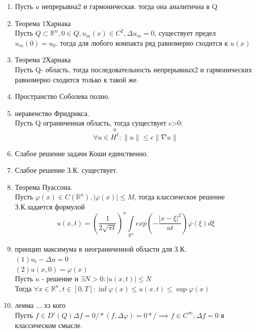 \documentclass[a4paper,12pt]{article}
\newcommand {\SL} {\implies}
\newcommand {\FI} {\varphi}
\newcommand {\iii} {\int\limits}
\begin{document}
\begin{enumerate}
\item Пусть $u$ непрерывна2 и гармоническая. тогда она аналитична в Q
\item Теорема 1Харнака\\
Пусть $Q\subset \mathbb{R}^n, 0\in Q, u_m(x)\in C^2, \Delta u_m=0$, существует предел $u_m(0) = u_0$. тогда для любого компакта ряд равномерно сходится к $u(x)$
\item Теорема 2Харнака\\
Пусть Q- область, тогда последовательность непрерывных2 и гармонических равномерно сходится только к такой же.\\
\item Пространство Соболева полно.
\item неравенство Фридрикса.\\
Пусть Q ограниченная область, тогда существует c>0:$$\forall u\in \stackrel{0}{H^1}: \|u\|\le c\|\nabla u\|$$
\item Слабое решение задачи Коши единственно.
\item Слабое решение З.К. существует.

\item Теорема Пуассона.\\
Пусть $\FI(x)\in C(\mathbb{R}^n), |\FI(x)|\le M$, тогда классическое решение З.К.задается формулой $$u(x,t) = \left(\frac{1}{2\sqrt{\pi t}}\right)^n\iii_{\mathbb{R}^n} exp \left(-\frac{|x-\xi|^2}{ut}\right)\FI(\xi)d\xi$$

\item принцип максимума в неограниченной области для З.К.\\
$(1) u_t - \Delta u=0$\\
$(2) u(x,0) = \FI(x)$\\
Пусть $u$ - решение и $\exists N>0: |u(x,t)|\le N$\\
Тогда $\forall x\in \mathbb{R}^n, t\in [0,T]: \inf \FI(x) \le u(x,t)\le \sup \FI(x)$
\item лемма ... хз кого\\
Пусть $f\in D'(Q) \Delta f=0 /*(f,\Delta \FI)=0*/  \SL f\in C^\infty, \Delta f = 0$ в классическом смысле.







\end{enumerate}

\newpage
\end{document}
